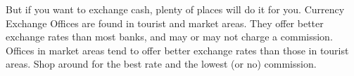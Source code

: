 But if you want to exchange cash, plenty of places will do it for you. Currency Exchange Offices  are found in tourist and market areas. They offer better exchange rates than most banks, and may or may not charge a commission. Offices in market areas tend to offer better exchange rates than those in tourist areas. Shop around for the best rate and the lowest (or no) commission.

